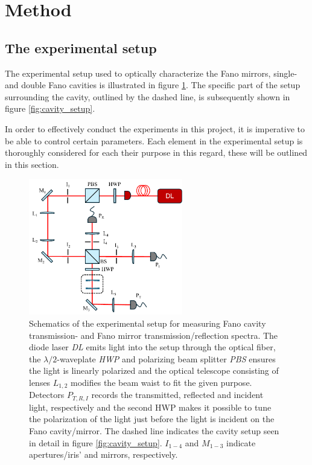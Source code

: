 \section{Method}
\subsection{The experimental setup}\label{sec:experimental_setup}

The experimental setup used to optically characterize the Fano mirrors, single- and double Fano cavities is illustrated in figure \ref{fig:setup_sketch}. The specific part of the setup surrounding the cavity, outlined by the dashed line, is subsequently shown in figure \ref{fig:cavity_setup}. 

In order to effectively conduct the experiments in this project, it is imperative to be able to control certain parameters. Each element in the experimental setup is thoroughly considered for each their purpose in this regard, these will be outlined in this section. 

\begin{figure}[h!]
    \centering
    \includegraphics[width=0.6\textwidth]{figures/setup_sketch.pdf}
    \caption{Schematics of the experimental setup for measuring Fano cavity transmission- and Fano mirror transmission/reflection spectra. The diode laser \emph{DL} emits light into the setup through the optical fiber, the $\lambda/2$-waveplate \emph{HWP} and polarizing beam splitter \emph{PBS} ensures the light is linearly polarized and the optical telescope consisting of lenses $L_{1,2}$ modifies the beam waist to fit the given purpose. Detectors $P_{T,R,I}$ records the transmitted, reflected and incident light, respectively and the second HWP makes it possible to tune the polarization of the light just before the light is incident on the Fano cavity/mirror. The dashed line indicates the cavity setup seen in detail in figure \ref{fig:cavity_setup}. $I_{1-4}$ and $M_{1-3}$ indicate apertures/iris' and mirrors, respectively.}
    \label{fig:setup_sketch}
\end{figure}


